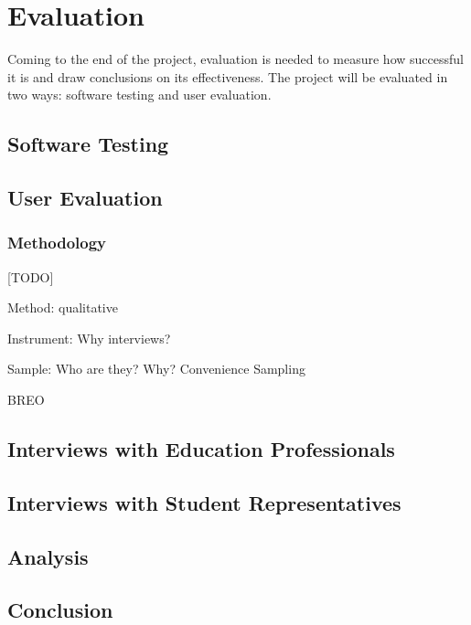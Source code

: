 \chapter{Evaluation}

Coming to the end of the project, evaluation is needed to measure how successful it is and 
draw conclusions on its effectiveness. The project will be evaluated in two ways: 
software testing and user evaluation.


\section{Software Testing}

\section{User Evaluation}

\subsection{Methodology}
[TODO]

Method: qualitative

Instrument: Why interviews?

Sample: Who are they? Why? Convenience Sampling

BREO

\section{Interviews with Education Professionals}

\section{Interviews with Student Representatives}

\section{Analysis}

\section{Conclusion}